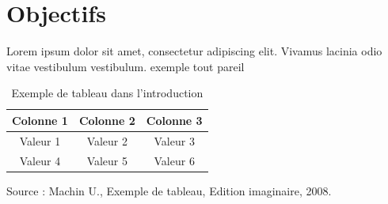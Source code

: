 \section{Objectifs}
Lorem ipsum dolor sit amet, consectetur adipiscing elit. Vivamus lacinia odio vitae vestibulum vestibulum.
\gls{exemple} tout pareil
\begin{table}[!ht]
    \centering
    \begin{tabular}{|c|c|c|}
        \hline
        Colonne 1 & Colonne 2 & Colonne 3 \\
        \hline
        Valeur 1 & Valeur 2 & Valeur 3 \\
        \hline
        Valeur 4 & Valeur 5 & Valeur 6 \\
        \hline
    \end{tabular}
    \caption{Exemple de tableau dans l'introduction}
    \label{tab:example_table}
    \vspace{0.2cm} %
    Source :  Machin U., Exemple de tableau, Edition imaginaire, 2008.
\end{table}


